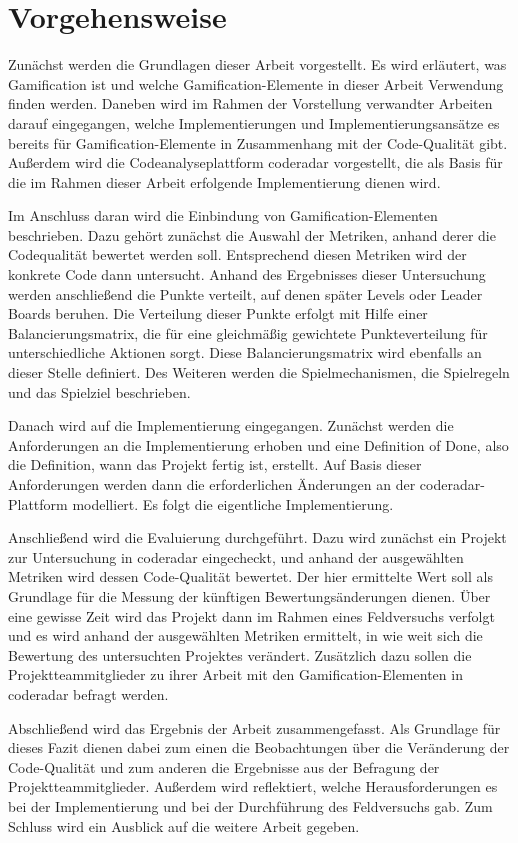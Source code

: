 \documentclass[fontsize=11pt, paper=a4, parskip=half]{scrartcl}
\begin{document}
\section{Vorgehensweise}
Zunächst werden die Grundlagen dieser Arbeit vorgestellt.
Es wird erläutert, was Gamification ist und welche Gamification-Elemente in dieser Arbeit Verwendung finden werden.
Daneben wird im Rahmen der Vorstellung verwandter Arbeiten darauf eingegangen, welche Implementierungen und Implementierungsansätze es bereits für Gamification-Elemente in Zusammenhang mit der Code-Qualität gibt.
Außerdem wird die Codeanalyseplattform coderadar vorgestellt, die als Basis für die im Rahmen dieser Arbeit erfolgende Implementierung dienen wird.

Im Anschluss daran wird die Einbindung von Gamification-Elementen beschrieben.
Dazu gehört zunächst die Auswahl der Metriken, anhand derer die Codequalität bewertet werden soll.
Entsprechend diesen Metriken wird der konkrete Code dann untersucht.
Anhand des Ergebnisses dieser Untersuchung werden anschließend die Punkte verteilt, auf denen später Levels oder Leader Boards beruhen.
Die Verteilung dieser Punkte erfolgt mit Hilfe einer Balancierungsmatrix, die für eine gleichmäßig gewichtete Punkteverteilung für unterschiedliche Aktionen sorgt.
Diese Balancierungsmatrix wird ebenfalls an dieser Stelle definiert.
Des Weiteren werden die Spielmechanismen, die Spielregeln und das Spielziel beschrieben.

Danach wird auf die Implementierung eingegangen.
Zunächst werden die Anforderungen an die Implementierung erhoben und eine Definition of Done, also die Definition, wann das Projekt fertig ist, erstellt.
Auf Basis dieser Anforderungen werden dann die erforderlichen Änderungen an der coderadar-Plattform modelliert.
Es folgt die eigentliche Implementierung.

Anschließend wird die Evaluierung durchgeführt.
Dazu wird zunächst ein Projekt zur Untersuchung in coderadar eingecheckt, und anhand der ausgewählten Metriken wird dessen Code-Qualität bewertet.
Der hier ermittelte Wert soll als Grundlage für die Messung der künftigen Bewertungsänderungen dienen.
Über eine gewisse Zeit wird das Projekt dann im Rahmen eines Feldversuchs verfolgt und es wird anhand der ausgewählten Metriken ermittelt, in wie weit sich die Bewertung des untersuchten Projektes verändert.
Zusätzlich dazu sollen die Projektteammitglieder zu ihrer Arbeit mit den Gamification-Elementen in coderadar befragt werden.

Abschließend wird das Ergebnis der Arbeit zusammengefasst.
Als Grundlage für dieses Fazit dienen dabei zum einen die Beobachtungen über die Veränderung der Code-Qualität und zum anderen die Ergebnisse aus der Befragung der Projektteammitglieder.
Außerdem wird reflektiert, welche Herausforderungen es bei der Implementierung und bei der Durchführung des Feldversuchs gab.
Zum Schluss wird ein Ausblick auf die weitere Arbeit gegeben.

\pagebreak



\end{document}

